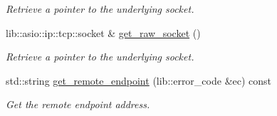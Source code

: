 \begin{DoxyCompactItemize}
\begin{DoxyCompactList}\small\item\em Retrieve a pointer to the underlying socket. \end{DoxyCompactList}\item 
lib\+::asio\+::ip\+::tcp\+::socket \& \mbox{\hyperlink{classwebsocketpp_1_1transport_1_1asio_1_1basic__socket_1_1connection_a2735b03146b13e956bf58cd9f2e51ff6}{get\+\_\+raw\+\_\+socket}} ()
\begin{DoxyCompactList}\small\item\em Retrieve a pointer to the underlying socket. \end{DoxyCompactList}\item 
std\+::string \mbox{\hyperlink{classwebsocketpp_1_1transport_1_1asio_1_1basic__socket_1_1connection_ab8e022cc8ebabf59c2884f6525729892}{get\+\_\+remote\+\_\+endpoint}} (lib\+::error\+\_\+code \&ec) const
\begin{DoxyCompactList}\small\item\em Get the remote endpoint address. \end{DoxyCompactList}\end{DoxyCompactItemize}
